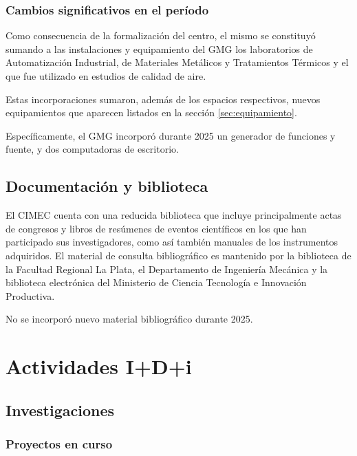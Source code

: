 \documentclass[a4paper,11pt,twoside,final,titlepage,onecolumn,openright]{report}
\begin{document}
\subsection{Cambios significativos en el período}

Como consecuencia de la formalización del centro, el mismo se constituyó sumando a las instalaciones y equipamiento del GMG los laboratorios de Automatización Industrial, de Materiales Metálicos y Tratamientos Térmicos y el que fue utilizado en estudios de calidad de aire.

Estas incorporaciones sumaron, además de los espacios respectivos, nuevos equipamientos que aparecen listados en la sección \ref{sec:equipamiento}.

Específicamente, el GMG incorporó durante 2025 un generador de funciones y fuente, y dos computadoras de escritorio.

\section{Documentación y biblioteca}

El CIMEC cuenta con una reducida biblioteca que incluye principalmente actas de congresos y libros de resúmenes de eventos científicos en los que han participado sus investigadores, como así también manuales de los instrumentos adquiridos. El material de consulta bibliográfico es mantenido por la biblioteca de la Facultad Regional La Plata, el Departamento de Ingeniería Mecánica y la biblioteca electrónica del Ministerio de Ciencia Tecnología e Innovación Productiva.

No se incorporó nuevo material bibliográfico durante 2025.

\chapter{Actividades I+D+i}

\section{Investigaciones}

\subsection{Proyectos en curso}
\end{document}
